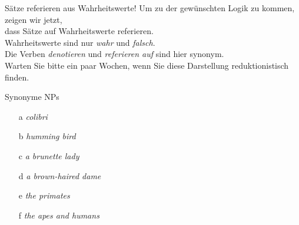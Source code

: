 \begin{frame}
  {Sätze referieren aus Wahrheitswerte!}
  \onslide<+->
  \onslide<+->
  \centering 
  Um zu der gewünschten Logik zu kommen, zeigen wir jetzt,\\
  dass \alert{Sätze auf Wahrheitswerte referieren}.\\
  \Halbzeile
  \onslide<+->
  Wahrheitswerte sind nur \alert{\textit{wahr}} und \alert{\textit{falsch}}.\\
  \Halbzeile
  \onslide<+->
  Die Verben \alert{\textit{denotieren}} und \textit{\alert{referieren auf}} sind hier synonym.\\
  \Doppelzeile
  \onslide<+->
  Warten Sie bitte ein paar Wochen, wenn Sie diese Darstellung reduktionistisch finden.
\end{frame}

\begin{frame}
  {Synonyme NPs}
  \onslide<+->
  \begin{itemize}[<+->]
    \item[a] \textit{colibri}
    \item[b] \textit{humming bird}
    \item[ ] 
      \Halbzeile
    \item[c] \textit{a brunette lady}
    \item[d] \textit{a brown-haired dame}
    \item[ ] 
      \Halbzeile
    \item[e] \textit{the primates}
    \item[f] \textit{the apes and humans}
    \item[ ] 
  \end{itemize}
\end{frame}

